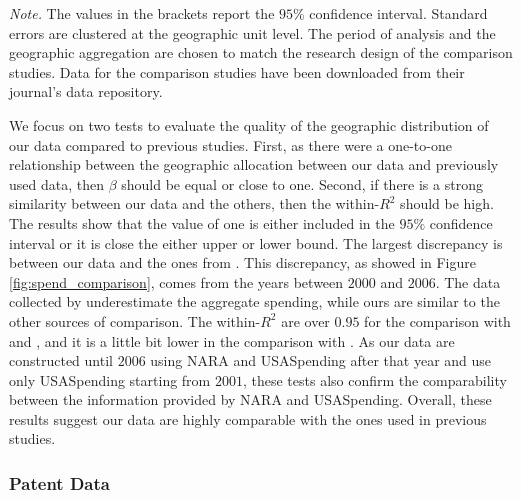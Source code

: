 \documentclass[dv_diss_main.tex]{subfiles}
\begin{document}
\begin{table}[!ht]
\begin{center}
\end{center}
\footnotesize{\textit{Note. } The values in the brackets report the $95\%$ confidence interval. Standard errors are clustered at the geographic unit level. The period of analysis and the geographic aggregation are chosen to match the research design of the comparison studies. Data for the comparison studies have been downloaded from their journal's data repository.}
\end{table} 


We focus on two tests to evaluate the quality of the geographic distribution of our data compared to previous studies. First, as there were a one-to-one relationship between the geographic allocation between our data and previously used data, then $\beta$ should be equal or close to one. Second, if there is a strong similarity between our data and the others, then the within-$R^{2}$ should be high. The results show that the value of one is either included in the $95\%$ confidence interval or it is close the either upper or lower bound. The largest discrepancy is between our data and the ones from \cite{Nakamura2014}. This discrepancy, as showed in Figure \ref{fig:spend_comparison}, comes from the years between $2000$ and $2006$. The data collected by \cite{Nakamura2014} underestimate the aggregate spending, while ours are similar to the other sources of comparison. The within-$R^{2}$ are over $0.95$ for the comparison with \cite{Nakamura2014} and \cite{Dupor2017}, and it is a little bit lower in the comparison with \cite{Demyanyk2019}. As our data are constructed until $2006$ using NARA and USASpending after that year and \cite{Demyanyk2019} use only USASpending starting from $2001$, these tests also confirm the comparability between the information provided by NARA and USASpending. Overall, these results suggest our data are highly comparable with the ones used in previous studies.


\subsubsection{Patent Data}\label{sec:app_patentdata}
\end{document}
